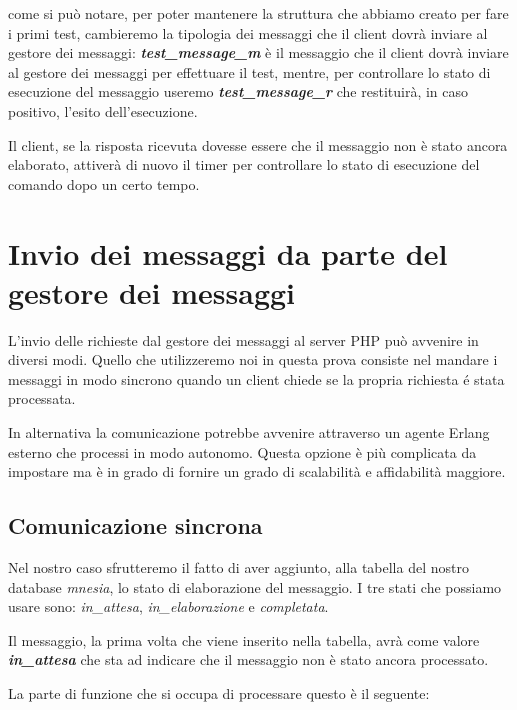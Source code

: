 come si pu\`o notare, per poter mantenere la struttura che abbiamo creato per fare i primi test, cambieremo la tipologia dei messaggi che il client dovr\`a inviare al gestore dei messaggi: \textit{\textbf{test\_message\_m}} \`e il messaggio che il client dovr\`a inviare al gestore dei messaggi per effettuare il test, mentre, per controllare lo stato di esecuzione del messaggio useremo \textbf{\textit{test\_message\_r}} che restituir\`a, in caso positivo, l'esito dell'esecuzione.

Il client, se la risposta ricevuta dovesse essere che il messaggio non \`e stato ancora elaborato, attiver\`a di nuovo il timer per controllare lo stato di esecuzione del comando dopo un certo tempo.

\section{Invio dei messaggi da parte del gestore dei messaggi}
L'invio delle richieste dal gestore dei messaggi al server PHP pu\`o avvenire in diversi modi. Quello che utilizzeremo noi in questa prova consiste nel mandare i messaggi in modo sincrono quando un client chiede se la propria richiesta \'e stata processata.

In alternativa la comunicazione potrebbe avvenire attraverso un agente Erlang esterno che processi in modo autonomo. Questa opzione \`e pi\`u complicata da impostare ma \`e in grado di fornire un grado di scalabilit\`a e affidabilit\`a maggiore.

\subsection{Comunicazione sincrona}
Nel nostro caso sfrutteremo il fatto di aver aggiunto, alla tabella del nostro database \textit{mnesia}, lo stato di elaborazione del messaggio. I tre stati che possiamo usare sono: \textit{in\_attesa}, \textit{in\_elaborazione} e \textit{completata}.
 
Il messaggio, la prima volta che viene inserito nella tabella, avr\`a come valore \textit{\textbf{in\_attesa}} che sta ad indicare che il messaggio non \`e stato ancora processato.

La parte di funzione che si occupa di processare questo \`e il seguente:

